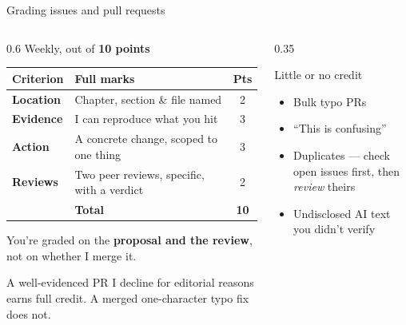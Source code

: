 \documentclass[9pt,aspectratio=169]{beamer}
\begin{document}
\begin{frame}{Grading issues and pull requests}
    \begin{columns}[T]
        \begin{column}{0.6\textwidth}
            Weekly, out of \textbf{10 points}
            \medskip
            \begin{table}
            \centering
            \footnotesize
            \begin{tabular}{llc}
                \toprule
                \textbf{Criterion} & \textbf{Full marks} & \textbf{Pts} \\ \midrule
                \textbf{Location} & Chapter, section \& file named & 2 \\
                \textbf{Evidence} & I can reproduce what you hit & 3 \\
                \textbf{Action} & A concrete change, scoped to one thing & 3 \\
                \textbf{Reviews} & Two peer reviews, specific, with a verdict & 2 \\ \midrule
                & \textbf{Total} & \textbf{10} \\
                \bottomrule
            \end{tabular}
            \end{table}

        \medskip
        You're graded on the \textbf{proposal and the review}, not on whether I merge it. 
        
        \medskip
        A well-evidenced PR I decline for editorial reasons earns full credit. A merged one-character typo fix does not.
        
        \end{column}
        \begin{column}{0.35\textwidth}
            \begin{block}{Little or no credit}
                \footnotesize
                \begin{itemize}\footnotesize
                    \item Bulk typo PRs
                    \item ``This is confusing''
                    \item Duplicates --- check open issues first, then \textit{review} theirs
                    \item Undisclosed AI text you didn't verify
                \end{itemize}
            \end{block}
        \end{column}
    \end{columns}
\end{frame}
\end{document}
